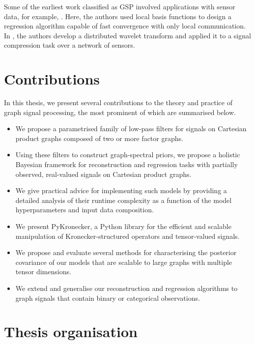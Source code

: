 Some of the earliest work classified as GSP involved applications with sensor data, for example, \cite{Guestrin2004}. Here, the authors used local basis functions to design a regression algorithm capable of fast convergence with only local communication. In \cite{Wagner2005}, the authors develop a distributed wavelet transform and applied it to a signal compression task over a network of sensors. 


\section{Contributions}

In this thesis, we present several contributions to the theory and practice of graph signal processing, the most prominent of which are summarised below. 

\begin{itemize}
    \item We propose a parametrised family of low-pass filters for signals on Cartesian product graphs composed of two or more factor graphs. 
    \item Using these filters to construct graph-spectral priors, we propose a holistic Bayesian framework for reconstruction and regression tasks with partially observed, real-valued signals on Cartesian product graphs. 
    \item We give practical advice for implementing such models by providing a detailed analysis of their runtime complexity as a function of the model hyperparameters and input data composition. 
    \item We present PyKronecker, a Python library for the efficient and scalable manipulation of Kronecker-structured operators and tensor-valued signals. 
    \item We propose and evaluate several methods for characterising the posterior covariance of our models that are scalable to large graphs with multiple tensor dimensions. 
    \item We extend and generalise our reconstruction and regression algorithms to graph signals that contain binary or categorical observations. 
\end{itemize}


\section{Thesis organisation}

